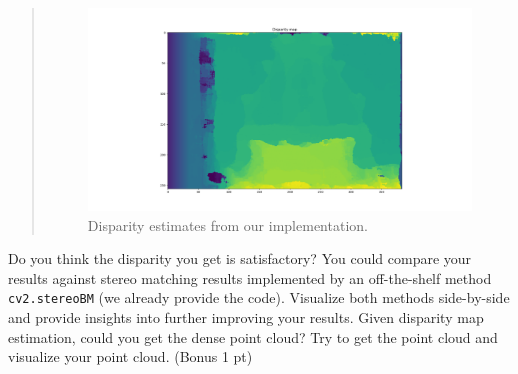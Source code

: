 \documentclass[11pt]{article}
\begin{document}
\begin{quote}
\begin{figure}[h]
    \centering
    \includegraphics[width=1.0\linewidth]{figs/disparity_ssd.png}
    \caption{Disparity estimates from our implementation.}
    \label{fig:disparity_ssd}
\end{figure}

\end{quote}

Do you think the disparity you get is satisfactory? You could compare your results against stereo matching results implemented by an off-the-shelf method \texttt{cv2.stereoBM} (we already provide the code). Visualize both methods side-by-side and provide insights into further improving your results. Given disparity map estimation, could you get the dense point cloud? Try to get the point cloud and visualize your point cloud.  (Bonus 1 pt)
\end{document}
